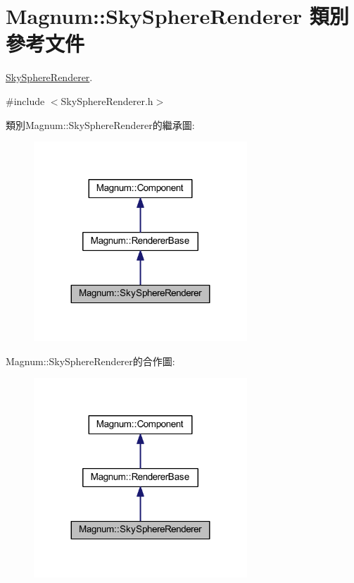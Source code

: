 \hypertarget{class_magnum_1_1_sky_sphere_renderer}{}\section{Magnum\+:\+:Sky\+Sphere\+Renderer 類別 參考文件}
\label{class_magnum_1_1_sky_sphere_renderer}


\hyperlink{class_magnum_1_1_sky_sphere_renderer}{Sky\+Sphere\+Renderer}.  




{\ttfamily \#include $<$Sky\+Sphere\+Renderer.\+h$>$}



類別\+Magnum\+:\+:Sky\+Sphere\+Renderer的繼承圖\+:\nopagebreak
\begin{figure}[H]
\begin{center}
\leavevmode
\includegraphics[width=227pt]{class_magnum_1_1_sky_sphere_renderer__inherit__graph}
\end{center}
\end{figure}


Magnum\+:\+:Sky\+Sphere\+Renderer的合作圖\+:\nopagebreak
\begin{figure}[H]
\begin{center}
\leavevmode
\includegraphics[width=227pt]{class_magnum_1_1_sky_sphere_renderer__coll__graph}
\end{center}
\end{figure}
